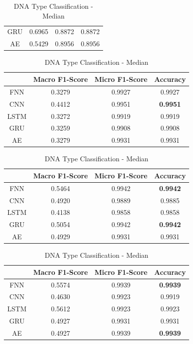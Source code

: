 \documentclass[conference]{IEEEtran}
\begin{document}
\begin{table}[htbp]
\begin{center}
\begin{tabular}{|c|c|c|c|}
GRU& 0.6965& 0.8872& 0.8872\\

AE& 0.5429& 0.8956& 0.8956\\
\hline
\end{tabular}
\end{center}

\begin{center}
\caption{DNA Type Classification - Dropped}
\begin{tabular}{|c|c|c|c|}
\hline
& Macro F1-Score& Micro F1-Score& Accuracy \\
\hline
FNN& 0.3279& 0.9927& 0.9927\\

CNN& 0.4412& 0.9951& \textbf{0.9951}\\

LSTM& 0.3272& 0.9919& 0.9919\\

GRU& 0.3259& 0.9908& 0.9908\\

AE& 0.3279& 0.9931& 0.9931\\
\hline
\end{tabular}
\end{center}


\begin{center}
\caption{DNA Type Classification - Mean}
\begin{tabular}{|c|c|c|c|}
\hline
& Macro F1-Score& Micro F1-Score& Accuracy \\
\hline
FNN& 0.5464& 0.9942& \textbf{0.9942}\\

CNN& 0.4920& 0.9889& 0.9885\\

LSTM& 0.4138& 0.9858& 0.9858\\

GRU& 0.5054& 0.9942& \textbf{0.9942}\\

AE& 0.4929& 0.9931& 0.9931\\
\hline
\end{tabular}
\end{center}

\begin{center}
\caption{DNA Type Classification - Median}
\begin{tabular}{|c|c|c|c|}
\hline
& Macro F1-Score& Micro F1-Score& Accuracy \\
\hline
FNN& 0.5574& 0.9939& \textbf{0.9939}\\

CNN& 0.4630& 0.9923& 0.9919\\

LSTM& 0.5612& 0.9923& 0.9923\\

GRU& 0.4927& 0.9931& 0.9931\\

AE& 0.4927& 0.9939& \textbf{0.9939}\\
\hline
\end{tabular}
\end{center}

\end{table}
\end{document}
